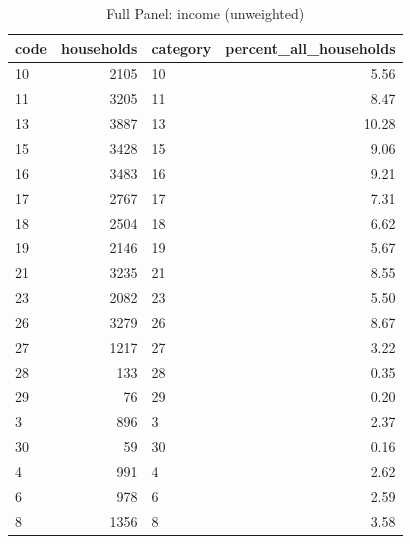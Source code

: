 \begin{table}
\caption{Full Panel: income (unweighted)}
\begin{tabular}{lrlr}
\toprule
code & households & category & percent\_all\_households \\
\midrule
10 & 2105 & 10 & 5.56 \\
11 & 3205 & 11 & 8.47 \\
13 & 3887 & 13 & 10.28 \\
15 & 3428 & 15 & 9.06 \\
16 & 3483 & 16 & 9.21 \\
17 & 2767 & 17 & 7.31 \\
18 & 2504 & 18 & 6.62 \\
19 & 2146 & 19 & 5.67 \\
21 & 3235 & 21 & 8.55 \\
23 & 2082 & 23 & 5.50 \\
26 & 3279 & 26 & 8.67 \\
27 & 1217 & 27 & 3.22 \\
28 & 133 & 28 & 0.35 \\
29 & 76 & 29 & 0.20 \\
3 & 896 & 3 & 2.37 \\
30 & 59 & 30 & 0.16 \\
4 & 991 & 4 & 2.62 \\
6 & 978 & 6 & 2.59 \\
8 & 1356 & 8 & 3.58 \\
\bottomrule
\end{tabular}
\end{table}
